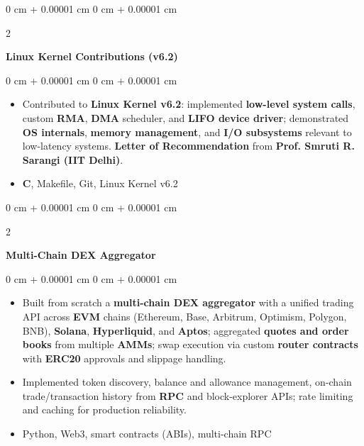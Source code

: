 \documentclass[10pt, letterpaper]{article}
\newenvironment{highlightsjustified}{
    \begin{itemize}[
        topsep=0.10 cm,
        parsep=0.10 cm,
        partopsep=0pt,
        itemsep=0pt,
        leftmargin=0 cm + 10pt
    ]
    \justifying
}{
    \end{itemize}
} %
\newenvironment{onecolentry}{
    \begin{adjustwidth}{
        0 cm + 0.00001 cm
    }{
        0 cm + 0.00001 cm
    }
}{
    \end{adjustwidth}
} %
\newenvironment{twocolentry}[2][]{
    \onecolentry
    \def\secondColumn{#2}
    \setcolumnwidth{\fill, 4.5 cm}
    \begin{paracol}{2}
}{
    \switchcolumn \raggedleft \secondColumn
    \end{paracol}
    \endonecolentry
} %
\begin{document}
        
        \begin{twocolentry}{
     
        }
            \textbf{Linux Kernel Contributions (v6.2)}
        
        \end{twocolentry}

        \vspace{0.10 cm}
        \begin{onecolentry}
            \begin{highlightsjustified}
                \item Contributed to \textbf{Linux Kernel v6.2}: implemented \textbf{low-level system calls}, custom \textbf{RMA}, \textbf{DMA} scheduler, and \textbf{LIFO device driver}; demonstrated \textbf{OS internals}, \textbf{memory management}, and \textbf{I/O subsystems} relevant to low-latency systems. \textbf{Letter of Recommendation} from \textbf{Prof. Smruti R. Sarangi (IIT Delhi)}.
                \item \textbf{C}, Makefile, Git, Linux Kernel v6.2
            \end{highlightsjustified}
        \end{onecolentry}


        \vspace{0.2 cm}

        \begin{twocolentry}{}
            \textbf{Multi-Chain DEX Aggregator}
        \end{twocolentry}

        \vspace{0.10 cm}
        \begin{onecolentry}
            \begin{highlightsjustified}
                \item Built from scratch a \textbf{multi-chain DEX aggregator} with a unified trading API across \textbf{EVM} chains (Ethereum, Base, Arbitrum, Optimism, Polygon, BNB), \textbf{Solana}, \textbf{Hyperliquid}, and \textbf{Aptos}; aggregated \textbf{quotes and order books} from multiple \textbf{AMMs}; swap execution via custom \textbf{router contracts} with \textbf{ERC20} approvals and slippage handling.
                \item Implemented token discovery, balance and allowance management, on-chain trade/transaction history from \textbf{RPC} and block-explorer APIs; rate limiting and caching for production reliability.
                \item Python, Web3, smart contracts (ABIs), multi-chain RPC
            \end{highlightsjustified}
        \end{onecolentry}
\end{document}
